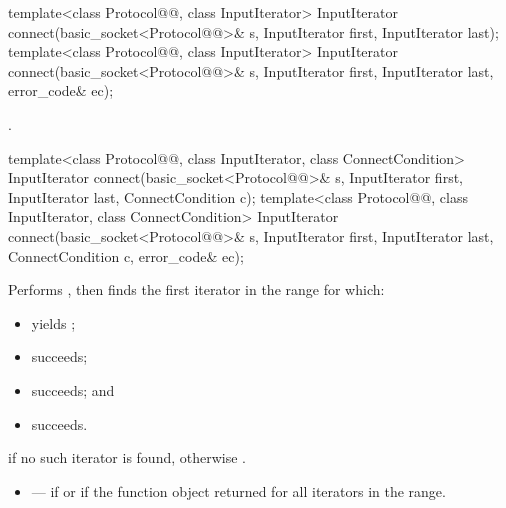 \begin{itemdecl}
template<class Protocol@@, class InputIterator>
  InputIterator connect(basic_socket<Protocol@@>& s,
                        InputIterator first, InputIterator last);
template<class Protocol@@, class InputIterator>
  InputIterator connect(basic_socket<Protocol@@>& s,
                        InputIterator first, InputIterator last,
                        error_code& ec);
\end{itemdecl}

\begin{itemdescr}
\pnum
\returns {}.
\end{itemdescr}

\begin{itemdecl}
template<class Protocol@@, class InputIterator, class ConnectCondition>
  InputIterator connect(basic_socket<Protocol@@>& s,
                        InputIterator first, InputIterator last,
                        ConnectCondition c);
template<class Protocol@@, class InputIterator, class ConnectCondition>
  InputIterator connect(basic_socket<Protocol@@>& s,
                        InputIterator first, InputIterator last,
                        ConnectCondition c, error_code& ec);
\end{itemdecl}

\begin{itemdescr}
\pnum
\effects Performs , then finds the first iterator  in the range  for which:
\begin{itemize}
\item
{} yields ;
\item
{} succeeds;
\item
{} succeeds; and
\item
{} succeeds.
\end{itemize}

\pnum
\returns {} if no such iterator is found, otherwise .

\pnum
\errors
\begin{itemize}
\item
{} --- if  or if the function object  returned  for all iterators in the range.
\end{itemize}
\end{itemdescr}



